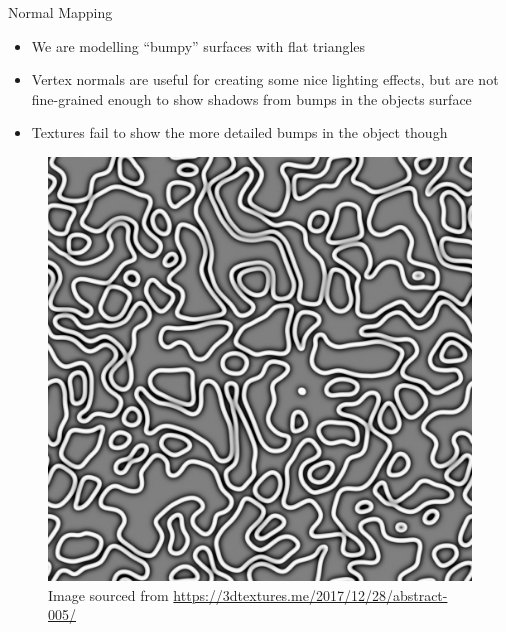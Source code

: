 \documentclass{beamer}
\begin{document}
\begin{frame}[fragile]{Normal Mapping}
    \begin{itemize}
        \item We are modelling ``bumpy'' surfaces with flat triangles
        \item Vertex normals are useful for creating some nice lighting effects, but are not fine-grained enough to
              show shadows from bumps in the objects surface
        \item Textures fail to show the more detailed bumps in the object though
    \end{itemize}

    \begin{figure}
        \centering
        \includegraphics[height=0.50\textheight]{images/Abstract_005_COLOR.jpg}
        \caption{\footnotesize{Image sourced from \url{https://3dtextures.me/2017/12/28/abstract-005/}}}
    \end{figure}
\end{frame}
\end{document}
